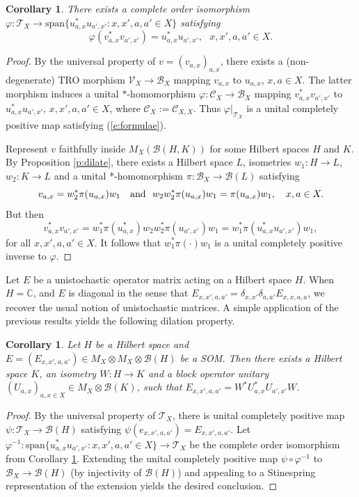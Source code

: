 \documentclass[11pt]{amsart}
\newtheorem{corollary}[theorem]{Corollary}
\theoremstyle{definition}
\newcommand{\cl}[1]{\mathcal{#1}}
\newcommand{\mc}[1]{\mathcal{#1}}
\newcommand{\ten}{\otimes}
\newcommand{\vphi}{\varphi}
\newcommand{\C}{\mathbb{C}}
\begin{document}
\begin{corollary}\label{c:order2} There exists a complete order isomorphism 
$\vphi:\cl{T}_X\to\mathrm{span}\{u_{a,x}^*u_{a',x'}:x,x',a,a'\in X\}$ satisfying
\begin{equation}\label{e:formulae}\vphi(v_{a,x}^*v_{a',x'})=u_{a,x}^*u_{a',x'}, \ \ \  x,x',a,a'\in X.\end{equation}
\end{corollary}

\begin{proof} 
By the universal property of 
$v=(v_{a,x})_{a,x}$, there exists a (non-degenerate) TRO morphism $\cl{V}_X\to\cl{B}_X$ mapping $v_{a,x}$ to $u_{a,x}$, $x,a\in X$. 
The latter morphism induces a unital $*$-homomorphism $\vphi:\cl{C}_X\to \mc{B}_X$ mapping $v_{a,x}^*v_{a',x'}$ to  $u_{a,x}^*u_{a',x'}$, 
$x,x',a,a'\in X$, where $\cl{C}_X:=\cl C_{X,X}$.
Thus $\vphi|_{\cl{T}_X}$ is a unital completely positive map satisfying (\ref{e:formulae}).

Represent $v$ faithfully inside $M_X(\mc{B}(H,K))$ 
for some Hilbert spaces $H$ and $K$. 
By Proposition \ref{p:dilate}, there exists a Hilbert space $L$, isometries $w_1:H\to L$, $w_2:K\to L$ and a unital *-homomorphism $\pi:\mc{B}_X\to\mc{B}(L)$ satisfying $$v_{a,x}=w_2^*\pi(u_{a,x})w_1 \ \ \ \textnormal{and}  \ \ w_2w_2^*\pi(u_{a,x})w_1=\pi(u_{a,x})w_1, \ \ \ x,a\in X.$$
But then 
$$v_{a,x}^*v_{a',x'}=w_1^*\pi(u_{a,x}^*)w_2w_2^*\pi(u_{a',x'})w_1=w_1^*\pi(u_{a,x}^*u_{a',x'})w_1,$$
for all $x,x',a,a'\in X$.
It follows that
$w_1^*\pi(\cdot)w_1$ is a unital completely positive inverse to $\vphi$.
\end{proof}

Let $E$ be a unistochastic operator matrix acting on a 
Hilbert space $H$. When $H=\C$, and $E$ is diagonal in the sense that $E_{x,x',a,a'}=\delta_{x,x'}\delta_{a,a'}E_{x,x,a,a}$, we recover the usual notion of unistochastic matrices. A simple application of the previous results yields the following dilation property.

\begin{corollary} 
Let $H$ be a Hilbert space and 
$E=(E_{x,x',a,a'})\in M_X\ten M_X\ten \cl{B}(H)$ be a SOM. Then there 
exists a Hilbert space $K$, an isometry $W:H\to K$ and a 
block operator unitary $(U_{a,x})_{a,x\in X} \in M_X\otimes\cl B(K)$, 
such that $E_{x,x',a,a'}=W^*U_{a,x}^*U_{a',x'}W$.
\end{corollary}

\begin{proof} By the universal property of $\cl{T}_X$, there is unital completely positive map $\psi:\cl{T}_X\to\mc{B}(H)$ satisfying $\psi(e_{x,x',a,a'})=E_{x,x',a,a'}$. Let  $\vphi^{-1}:\mathrm{span}\{u_{a,x}^*u_{a',x'}: x,x',a,a'\in X\}\to \cl{T}_X$ be the complete order isomorphism from Corollary \ref{c:order2}. Extending the unital completely positive map $\psi\circ\vphi^{-1}$ to $\cl{B}_X\to\mc{B}(H)$ (by injectivity of $\mc{B}(H)$) and appealing to a Stinespring representation of the extension yields the desired conclusion.
\end{proof}
\end{document}
